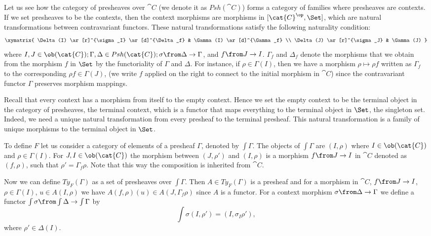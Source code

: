 Let us see how the category of presheaves over $\cat{C}$ (we denote it as
$Psh(\cat{C})$) forms a category of families where presheaves are contexts.  If
we set presheaves to be the contexts, then the context morphisms are morphisms
in $[\cat{C}^\op, \Set]$, which are natural transformations between contravariant
functors. These natural transformations satisfy the following naturality
condition:
\[
  \xymatrix{
    \Delta(I) \ar[r]^{\sigma_I} \ar[d]^{\Delta_f} & \Gamma(I) \ar[d]^{\Gamma_f} \\
    \Delta(J) \ar[r]^{\sigma_J} & \Gamma(J)
  }
\]
where $I, J \in \ob(\cat{C}); \Gamma, \Delta \in Psh(\cat{C}); \sigma
\from \Delta \to \Gamma$, and $f \from J \to I$. $\Gamma_f$ and $\Delta_f$
denote the morphisms that we obtain from the morphism $f$ in $\Set$ by the
functoriality of $\Gamma$ and $\Delta$. For instance, if $\rho \in \Gamma(I)$,
then we have a morphism $\rho \mapsto \rho f$ written as $\Gamma_f$ to the
corresponding $\rho f \in \Gamma(J)$, (we write $f$ applied on the right to
connect to the initial morphism in $\cat{C}$) since the contravariant functor
$\Gamma$ preserves morphism mappings.

Recall that every context has a morphism from itself to the empty context.
Hence we set the empty context to be the terminal object in the category of
presheaves, the terminal context, which is a functor that maps everything to
the terminal object in $\Set$, the singleton set. Indeed, we need a unique
natural transformation from every presheaf to the terminal presheaf. This
natural transformation is a family of unique morphisms to the terminal object
in $\Set$.

To define $F$ let us consider a category of elements of a presheaf $\Gamma$,
denoted by $\int\Gamma$. The objects of $\int \Gamma$ are $(I, \rho)$ where
$I \in \ob(\cat{C})$ and $\rho \in \Gamma(I)$. For $J, I \in \ob(\cat{C})$ the
morphism between $(J, \rho')$ and $(I, \rho)$ is a morphism $f \from J \to I$
in $\cat{C}$ denoted as $(f, \rho)$, such that $\rho' = \Gamma_f \rho$. Note
that this way the composition is inherited from $\cat{C}$.

Now we can define $Ty_F(\Gamma)$ as a set of presheaves over $\int \Gamma$.
Then $A \in Ty_F(\Gamma)$ is a presheaf and for a morphism in $\cat{C}$, $f
\from J \to I$, $\rho \in \Gamma(I)$, $u \in A(I, \rho)$ we have $A(f, \rho)(u)
\in A(J, \Gamma_f \rho)$ since $A$ is a functor. For a context morphism $\sigma
\from \Delta \to \Gamma$ we define a functor $\int \sigma \from \int \Delta \to
\int \Gamma$ by
\[
 \int \sigma (I, \rho') = (I, \sigma_I \rho'),
\]
where $\rho' \in \Delta(I)$.

